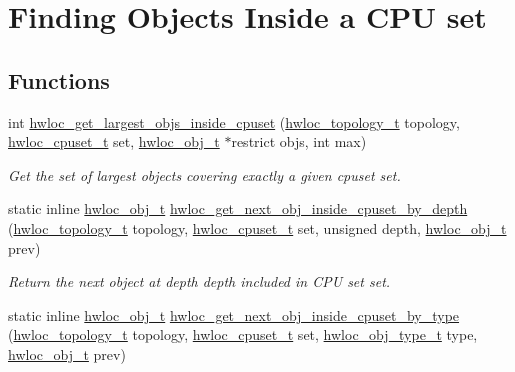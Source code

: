 \hypertarget{group__hwlocality__helper__find__inside}{
\section{Finding Objects Inside a CPU set}
\label{group__hwlocality__helper__find__inside}
}
\subsection*{Functions}
\begin{DoxyCompactItemize}
\item 
int \hyperlink{group__hwlocality__helper__find__inside_ga762bf572ecf691ad812977ce29496ac2}{hwloc\_\-get\_\-largest\_\-objs\_\-inside\_\-cpuset} (\hyperlink{group__hwlocality__topology_ga9d1e76ee15a7dee158b786c30b6a6e38}{hwloc\_\-topology\_\-t} topology, \hyperlink{group__hwlocality__cpuset_ga7366332f7090f5b54d4b25a0c2c4b411}{hwloc\_\-cpuset\_\-t} set, \hyperlink{structhwloc__obj}{hwloc\_\-obj\_\-t} $\ast$restrict objs, int max)
\begin{DoxyCompactList}\small\item\em Get the set of largest objects covering exactly a given cpuset {\ttfamily set}. \item\end{DoxyCompactList}\item 
static inline \hyperlink{structhwloc__obj}{hwloc\_\-obj\_\-t} \hyperlink{group__hwlocality__helper__find__inside_ga9f0cdb50962d59220a557757278e1919}{hwloc\_\-get\_\-next\_\-obj\_\-inside\_\-cpuset\_\-by\_\-depth} (\hyperlink{group__hwlocality__topology_ga9d1e76ee15a7dee158b786c30b6a6e38}{hwloc\_\-topology\_\-t} topology, \hyperlink{group__hwlocality__cpuset_ga7366332f7090f5b54d4b25a0c2c4b411}{hwloc\_\-cpuset\_\-t} set, unsigned depth, \hyperlink{structhwloc__obj}{hwloc\_\-obj\_\-t} prev)
\begin{DoxyCompactList}\small\item\em Return the next object at depth {\ttfamily depth} included in CPU set {\ttfamily set}. \item\end{DoxyCompactList}\item 
static inline \hyperlink{structhwloc__obj}{hwloc\_\-obj\_\-t} \hyperlink{group__hwlocality__helper__find__inside_ga060d4f60652ef68bc25bf83e5db1fdb9}{hwloc\_\-get\_\-next\_\-obj\_\-inside\_\-cpuset\_\-by\_\-type} (\hyperlink{group__hwlocality__topology_ga9d1e76ee15a7dee158b786c30b6a6e38}{hwloc\_\-topology\_\-t} topology, \hyperlink{group__hwlocality__cpuset_ga7366332f7090f5b54d4b25a0c2c4b411}{hwloc\_\-cpuset\_\-t} set, \hyperlink{group__hwlocality__types_gacd37bb612667dc437d66bfb175a8dc55}{hwloc\_\-obj\_\-type\_\-t} type, \hyperlink{structhwloc__obj}{hwloc\_\-obj\_\-t} prev)

\end{DoxyCompactItemize}
